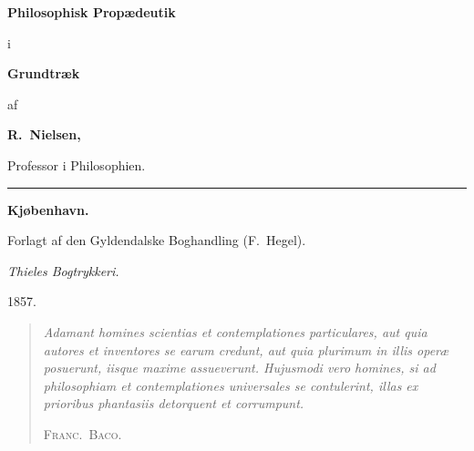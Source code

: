 \documentclass[12pt]{book}
\begin{document}
\begin{titlepage}
\centering
\vspace*{2.2cm}
{\Huge\bfseries Philosophisk Propædeutik\par}
\vspace{1.1cm}
{\LARGE i\par}
\vspace{0.9cm}
{\LARGE\bfseries Grundtræk\par}
\vspace{1.1cm}
{\large af\par}
\vspace{0.9cm}
{\LARGE\bfseries R.\ Nielsen,\par}
\vspace{0.2cm}
{\normalsize Professor i Philosophien.\par}
\vspace{2.2cm}
\rule{4cm}{0.4pt}\par
\vspace{1.6cm}
{\large\bfseries Kjøbenhavn.\par}
\vspace{0.4cm}
{\normalsize Forlagt af den Gyldendalske Boghandling (F.\ Hegel).\par}
\vspace{0.3cm}
{\small\emph{Thieles Bogtrykkeri.}\par}
\vspace{0.6cm}
{\large 1857.\par}
\end{titlepage}

\frontmatter

\thispagestyle{empty}
\vspace*{0.38\textheight}
\begin{quote}
\itshape\noindent Adamant homines scientias et contemplationes particulares, aut
quia autores et inventores se earum credunt, aut quia plurimum in illis operæ
posuerunt, iisque maxime assueverunt. Hujusmodi vero homines, si ad philosophiam
et contemplationes universales se contulerint, illas ex prioribus phantasiis
detorquent et corrumpunt.
\par\vspace{8pt}\normalfont\hfill\textsc{Franc.\ Baco.}
\end{quote}
\end{document}
